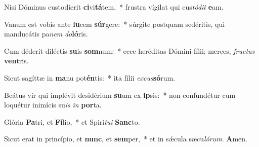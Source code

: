 

Nisi Dóminus custodíerit \textbf{ci}vi\textbf{tá}tem,~* frustra vígilat qui cus\textit{tó}\textit{dit} \textbf{e}am.

Vanum est vobis ante \textbf{lu}cem \textbf{súr}gere:~* súrgite postquam sedéritis, qui manducátis pa\textit{nem} \textit{do}\textbf{ló}ris.

Cum déderit diléctis \textbf{su}is \textbf{som}num:~* ecce heréditas Dómini fílii: merces, \textit{fruc}\textit{tus} \textbf{ven}tris.

Sicut sagíttæ in \textbf{ma}nu pot\textbf{én}tis:~* ita fílii \textit{ex}\textit{cus}\textbf{só}rum.

Beátus vir qui implévit desidérium \textbf{su}um ex \textbf{ip}sis:~* non confundétur cum loquétur inimícis su\textit{is} \textit{in} \textbf{por}ta.

Glória \textbf{Pa}tri, et \textbf{Fí}lio,~* et Spirí\textit{tu}\textit{i} \textbf{Sanc}to.

Sicut erat in princípio, et \textbf{nunc}, et \textbf{sem}per,~* et in sǽcula sæcu\textit{ló}\textit{rum}. \textbf{A}men.

